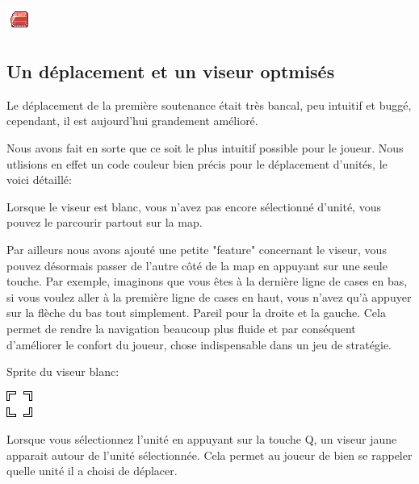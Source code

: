 \documentclass{article}
\begin{document}
\includegraphics[scale=1]{truck}

\newpage

\subsection{Un déplacement et un viseur optmisés}

\par
Le déplacement de la première soutenance était très bancal, peu intuitif et buggé, cependant, il est aujourd'hui grandement amélioré.
\newline

\par
Nous avons fait en sorte que ce soit le plus intuitif possible pour le joueur. Nous utlisions en effet un code couleur bien précis pour le déplacement d'unités, le voici détaillé:
\newline

\par
Lorsque le viseur est blanc, vous n'avez pas encore sélectionné d'unité, vous pouvez le parcourir partout sur la map.
\newline

\par
Par ailleurs nous avons ajouté une petite "feature" concernant le viseur, vous pouvez désormais passer de l'autre côté de la map en appuyant sur une seule touche. Par exemple, imaginons que vous êtes à la dernière ligne de cases en bas, si vous voulez aller à la première ligne de cases en haut,
vous n'avez qu'à appuyer sur la flèche du bas tout simplement. Pareil pour la droite et la gauche. Cela permet de rendre la navigation beaucoup plus fluide et par conséquent d'améliorer le confort du joueur, chose indispensable dans un jeu de stratégie.
\newline

\par
Sprite du viseur blanc:
\newline

\includegraphics[scale=1]{blanc}

\newline

\par
Lorsque vous sélectionnez l'unité en appuyant sur la touche Q, un viseur jaune apparait autour de l'unité sélectionnée. Cela permet au joueur de bien se rappeler quelle unité il a choisi de déplacer.
\newline
\end{document}
